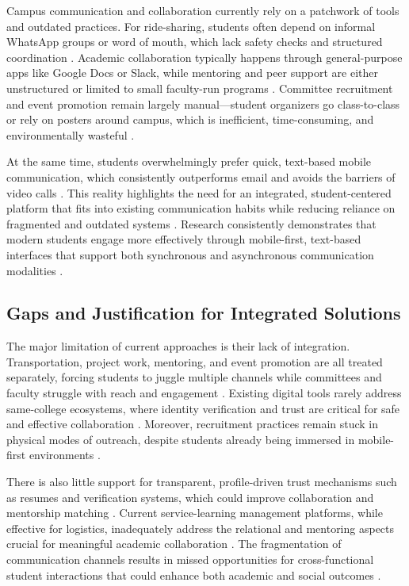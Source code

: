 \documentclass[conference]{IEEEtran}
\begin{document}
Campus communication and collaboration currently rely on a patchwork of tools and outdated practices. For ride-sharing, students often depend on informal WhatsApp groups or word of mouth, which lack safety checks and structured coordination \cite{ref15}\cite{ref16}. Academic collaboration typically happens through general-purpose apps like Google Docs or Slack, while mentoring and peer support are either unstructured or limited to small faculty-run programs \cite{ref17}\cite{ref1}. Committee recruitment and event promotion remain largely manual—student organizers go class-to-class or rely on posters around campus, which is inefficient, time-consuming, and environmentally wasteful \cite{ref2}\cite{ref3}.

At the same time, students overwhelmingly prefer quick, text-based mobile communication, which consistently outperforms email and avoids the barriers of video calls \cite{ref4}\cite{ref5}. This reality highlights the need for an integrated, student-centered platform that fits into existing communication habits while reducing reliance on fragmented and outdated systems \cite{ref6}\cite{ref7}. Research consistently demonstrates that modern students engage more effectively through mobile-first, text-based interfaces that support both synchronous and asynchronous communication modalities \cite{ref8}\cite{ref9}.

\subsection{Gaps and Justification for Integrated Solutions}

The major limitation of current approaches is their lack of integration. Transportation, project work, mentoring, and event promotion are all treated separately, forcing students to juggle multiple channels while committees and faculty struggle with reach and engagement \cite{ref10}\cite{ref11}. Existing digital tools rarely address same-college ecosystems, where identity verification and trust are critical for safe and effective collaboration \cite{ref12}\cite{ref13}. Moreover, recruitment practices remain stuck in physical modes of outreach, despite students already being immersed in mobile-first environments \cite{ref14}.

There is also little support for transparent, profile-driven trust mechanisms such as resumes and verification systems, which could improve collaboration and mentorship matching \cite{ref15}\cite{ref16}. Current service-learning management platforms, while effective for logistics, inadequately address the relational and mentoring aspects crucial for meaningful academic collaboration \cite{ref17}\cite{ref1}. The fragmentation of communication channels results in missed opportunities for cross-functional student interactions that could enhance both academic and social outcomes \cite{ref2}\cite{ref3}.
\end{document}
